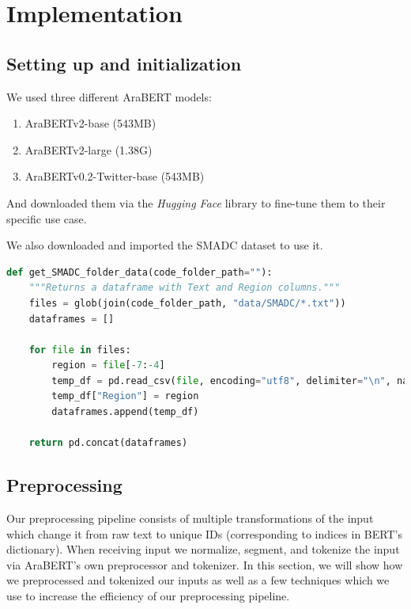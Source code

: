 \documentclass[12pt]{diazessay}
\begin{document}
    \section{Implementation}
    
    \subsection{Setting up and initialization} \label{txt:models}
    We used three different AraBERT models\cite{antoun2020arabert}:
    \begin{enumerate}
        \item AraBERTv2-base (543MB)
        \item AraBERTv2-large (1.38G)
        \item AraBERTv0.2-Twitter-base (543MB)
    \end{enumerate}
    And downloaded them via the \emph{Hugging Face} library to fine-tune them to their specific use case.
    
    We also downloaded and imported the SMADC dataset to use it.
    
    \begin{lstlisting}[language=Python, basicstyle=\footnotesize]
    def get_SMADC_folder_data(code_folder_path=""):
    """Returns a dataframe with Text and Region columns."""
    files = glob(join(code_folder_path, "data/SMADC/*.txt"))
    dataframes = []

    for file in files:
        region = file[-7:-4]
        temp_df = pd.read_csv(file, encoding="utf8", delimiter="\n", names=["Text"])
        temp_df["Region"] = region
        dataframes.append(temp_df)
    
    return pd.concat(dataframes)
    \end{lstlisting}
    
    \subsection{Preprocessing}
    Our preprocessing pipeline consists of multiple transformations of the input which change it from raw text to unique IDs (corresponding to indices in BERT's dictionary). When receiving input we normalize, segment, and tokenize the input via AraBERT's own preprocessor and tokenizer. In this section, we will show how we preprocessed and tokenized our inputs as well as a few techniques which we use to increase the efficiency of our preprocessing pipeline.
\end{document}
